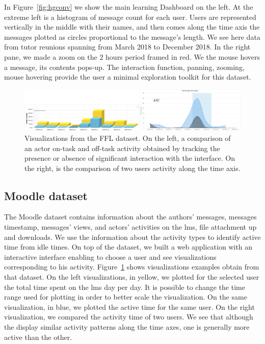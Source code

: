 \documentclass[a4paper,twoside]{article}
\begin{document}
In Figure~\ref{fig:hgconv} we show the main learning Dashboard on the left.  At the extreme left is a histogram of message count for each user.  Users are represented vertically in the middle with their names, and then comes along the time axis the messages plotted as circles proportional to the message's length.  We see here data from tutor reunions spanning from March 2018 to December 2018.
In the right pane, we made a zoom on the 2 hours period framed in red.  We the mouse hovers a message, its contents pops-up.  The interaction function, panning, zooming, mouse hovering provide the user a minimal exploration toolkit for this dataset.


\begin{figure}[t]
  \centering
  \includegraphics[width=\textwidth]{images/dynco.png}
  \small{
    \caption{\label{fig:dynco}
      Visualizations from the FFL dataset.  On the left, a comparison of an actor on-task and off-task activity obtained by tracking the presence or absence of significant interaction with the interface.  On the right, is the comparison of two users activity along the time axis.
    }}
\end{figure}


\subsection{Moodle dataset}
The Moodle dataset contains information about the authors' messages, messages timestamp, messages' views, and actors' activities on the \gls{lms}, file attachment up and downloads.  We use the information about the activity types to identify active time from idle times.
On top of the dataset, we built a web application with an interactive interface enabling to choose a user and see visualizations corresponding to his activity. Figure~\ref{fig:dynco} shows visualizations examples obtain from that dataset.  On the left visualizations, in yellow,  we plotted for the selected user the total time spent on the \gls{lms} day per day.  It is possible to change the time range used for plotting in order to better scale the visualization.  On the same visualization, in blue, we  plotted the active time for the same user.
On the right visualization, we compared the activity time of two users.  We see that although the display similar activity patterns along the time axes, one is generally more active than the other.
\end{document}
